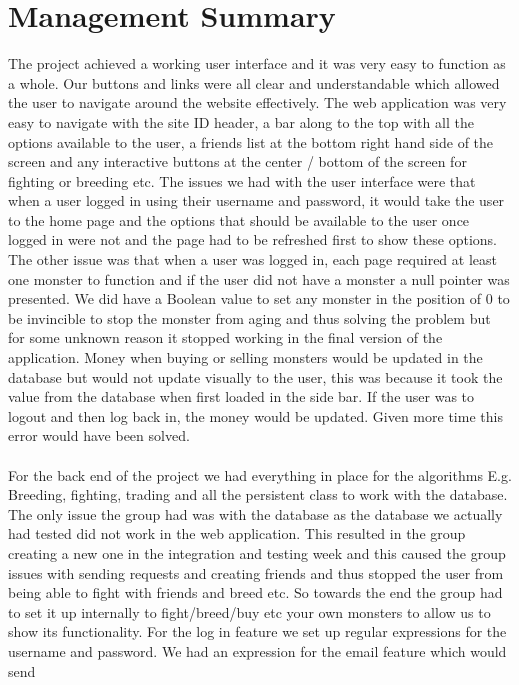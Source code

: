 \documentclass[titlepage]{article}
\begin{document}
\section {Management Summary}
\normalsize {The project achieved a working user interface and it was very easy to function as a whole. Our buttons and links were all clear and understandable which allowed the user to navigate around the website effectively. The web application was very easy to
navigate with the site ID header, a bar along to the top with all the options available to the user, a friends list at the
bottom right hand side of the screen and any interactive buttons at the center / bottom of the screen for
fighting or breeding etc. The issues we had with the user interface were that when a user logged in using their
username and password, it would take the user to the home page and the options that should be available to the user once logged in were not and the page had to be refreshed first to show these options. The other issue was that when a user was logged in, each page required at least one monster to function and if the user did not have a monster 
a null pointer was presented. We did have a Boolean
value to set any monster in the position of 0 to be invincible to stop the monster from aging and thus solving
the problem but for some unknown reason it stopped working in the final version of the application. Money when
buying or selling monsters would be updated in the database but would not update visually to the user, this was because it took the value from the database when first loaded in the side bar. If
the user was to logout and then log back in, the money would be updated. Given more time this error
would have been solved.
\\
\\
For the back end of the project we had everything in place for the algorithms E.g. Breeding, fighting, trading and all the persistent class to work with the database. The only issue the group
had was with the database as the database we actually had tested did not work in the web application. This resulted in the group 
creating a new one in the integration and testing week and this caused the group issues
with sending requests and creating friends and thus stopped the user from being able to fight with friends and breed etc. 
So towards the end the group had to set it up internally to fight/breed/buy etc your own
monsters to allow us to show its functionality. For the log in feature we set up
regular expressions for the username and password. We had an expression for the email feature which would send
}
\end{document}
